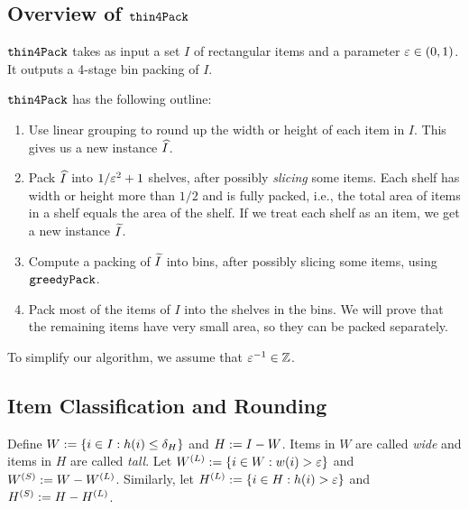 \subsection{Overview of \texorpdfstring{$\operatorname{\mathtt{thin4Pack}}$}{thin4Pack}}

$\operatorname{\mathtt{thin4Pack}}$ takes as input a set $I$ of rectangular items
and a parameter $\varepsilon \in (0, 1)$.
It outputs a 4-stage bin packing of $I$.

$\operatorname{\mathtt{thin4Pack}}$ has the following outline:
\begin{enumerate}
\item Use linear grouping to round up the width or height of each item in $I$.
    This gives us a new instance $\widehat{I}$.
\item Pack $\widehat{I}$ into $1/\varepsilon^2 + 1$ shelves,
    after possibly \emph{slicing} some items.
    Each shelf has width or height more than $1/2$ and is fully packed, i.e.,
    the total area of items in a shelf equals the area of the shelf.
    If we treat each shelf as an item, we get a new instance $\widetilde{I}$.
\item Compute a packing of $\widetilde{I}$ into bins, after possibly slicing some items,
    using $\operatorname{\mathtt{greedyPack}}$.
\item Pack most of the items of $I$ into the shelves in the bins. We will prove that
    the remaining items have very small area, so they can be packed separately.
\end{enumerate}

To simplify our algorithm, we assume that $\varepsilon^{-1} \in \mathbb{Z}$.

\subsection{Item Classification and Rounding}
\label{sec:bp-algo:round}

Define $W := \{i \in I: h(i) \le \delta_H \}$ and $H := I - W$.
Items in $W$ are called \emph{wide} and items in $H$ are called \emph{tall}.
Let $W^{(L)} := \{i \in W: w(i) > \varepsilon \}$ and $W^{(S)} := W - W^{(L)}$.
Similarly, let $H^{(L)} := \{i \in H: h(i) > \varepsilon \}$ and $H^{(S)} := H - H^{(L)}$.


